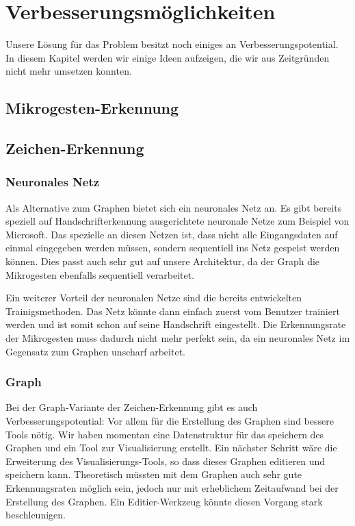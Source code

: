 \chapter{Verbesserungsmöglichkeiten}
Unsere Lösung für das Problem besitzt noch einiges an Verbesserungspotential. In diesem Kapitel werden wir einige Ideen aufzeigen, die wir aus Zeitgründen nicht mehr umsetzen konnten.

\section{Mikrogesten-Erkennung}


\section{Zeichen-Erkennung}
\subsection{Neuronales Netz}
Als Alternative zum Graphen bietet sich ein neuronales Netz an. Es gibt bereits speziell auf Handschrifterkennung ausgerichtete neuronale Netze zum Beispiel von Microsoft. Das spezielle an diesen Netzen ist, dass nicht alle Eingangsdaten auf einmal eingegeben werden müssen, sondern sequentiell ins Netz gespeist werden können. Dies passt auch sehr gut auf unsere Architektur, da der Graph die Mikrogesten ebenfalls sequentiell verarbeitet.

Ein weiterer Vorteil der neuronalen Netze sind die bereits entwickelten Trainigsmethoden. Das Netz könnte dann einfach zuerst vom Benutzer trainiert werden und ist somit schon auf seine Handschrift eingestellt. Die Erkennungsrate der Mikrogesten muss dadurch nicht mehr perfekt sein, da ein neuronales Netz im Gegensatz zum Graphen unscharf arbeitet. 

\subsection{Graph}
Bei der Graph-Variante der Zeichen-Erkennung gibt es auch Verbesserungspotential: Vor allem für die Erstellung des Graphen sind bessere Tools nötig. Wir haben momentan eine Datenstruktur für das speichern des Graphen und ein Tool zur Visualisierung erstellt. Ein nächster Schritt wäre die Erweiterung des Visualisierungs-Tools, so dass dieses Graphen editieren und speichern kann. Theoretisch müssten mit dem Graphen auch sehr gute Erkennungsraten möglich sein, jedoch nur mit erheblichem Zeitaufwand bei der Erstellung des Graphen. Ein Editier-Werkzeug könnte diesen Vorgang stark beschleunigen.

